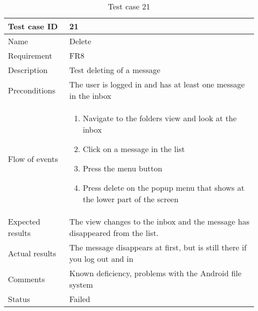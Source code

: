 		\begin{table}
			\begin{tabular}{l|p{10cm}}
				Test case ID & 21 \\ \hline
				Name & Delete\\ \hline
				Requirement & FR8\\ \hline
				Description & Test deleting of a message\\ \hline
				Preconditions & The user is logged in and has at least one message in the inbox\\ \hline
				Flow of events & 
					\begin{enumerate}
						\item{}Navigate to the folders view and look at the inbox
						\item{}Click on a message in the list
						\item{}Press the menu button
						\item{}Press delete on the popup menu that shows at the lower part of the screen
					\end{enumerate} \\ \hline
				Expected results & The view changes to the inbox and the message has disappeared from the list. \\ \hline
				Actual results &The message disappears at first, but is still there if you log out and in\\ \hline
				Comments &Known deficiency, problems with the Android file system\\ \hline
				Status &Failed \\ \hline
			\end{tabular}
			\caption{Test case 21} \label{tab:case21}
		\end{table}

